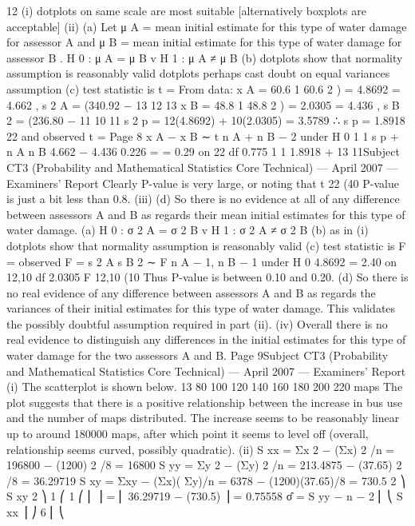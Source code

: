 12
(i)
dotplots on same scale are most suitable
[alternatively boxplots are acceptable]
(ii)
(a)
Let μ A = mean initial estimate for this type of water damage for
assessor A and μ B = mean initial estimate for this type of water damage
for assessor B .
H 0 : μ A = μ B v H 1 : μ A ≠ μ B
(b) dotplots show that normality assumption is reasonably valid
dotplots perhaps cast doubt on equal variances assumption
(c) test statistic is t =
From data: x A = 60.6
1
60.6 2
) = 4.8692
= 4.662 , s 2 A = (340.92 −
13
12
13
x B = 48.8
1
48.8 2
) = 2.0305
= 4.436 , s B 2 = (236.80 −
11
10
11
s 2 p = 12(4.8692) + 10(2.0305)
= 3.5789 ∴ s p = 1.8918
22
and
observed t =
Page 8
x A − x B
∼ t n A + n B − 2 under H 0
1
1
s p
+
n A n B
4.662 − 4.436
0.226
=
= 0.29 on 22 df
0.775
1 1
1.8918
+
13 11Subject CT3 (Probability and Mathematical Statistics Core Technical) — April 2007 — Examiners’ Report
Clearly P-value is very large, or noting that t 22 (40%
P-value is just a bit less than 0.8.
(iii)
(d) So there is no evidence at all of any difference between assessors A
and B as regards their mean initial estimates for this type of water
damage.
(a) H 0 : σ 2 A = σ 2 B v H 1 : σ 2 A ≠ σ 2 B
(b) as in (i) dotplots show that normality assumption is reasonably valid
(c) test statistic is F =
observed F =
s 2 A
s B 2
∼ F n A − 1, n B − 1 under H 0
4.8692
= 2.40 on 12,10 df
2.0305
F 12,10 (10%
Thus P-value is between 0.10 and 0.20.
(d)
So there is no real evidence of any difference between assessors A and
B as regards the variances of their initial estimates for this type of
water damage.
This validates the possibly doubtful assumption required in part (ii).
(iv)
Overall there is no real evidence to distinguish any differences in the initial
estimates for this type of water damage for the two assessors A and B.
Page 9Subject CT3 (Probability and Mathematical Statistics Core Technical) — April 2007 — Examiners’ Report
(i)
The scatterplot is shown below.
13
80
100
120
140
160
180
200
220
maps
The plot suggests that there is a positive relationship between the increase in
bus use and the number of maps distributed. The increase seems to be
reasonably linear up to around 180000 maps, after which point it seems to
level off (overall, relationship seems curved, possibly quadratic).
(ii)
S xx = Σx 2 − (Σx) 2 /n = 196800 − (1200) 2 /8 = 16800
S yy = Σy 2 − (Σy) 2 /n = 213.4875 − (37.65) 2 /8 = 36.29719
S xy = Σxy − (Σx)( Σy)/n = 6378 − (1200)(37.65)/8 = 730.5
2 ⎞
S xy 2 ⎞ 1 ⎛
1 ⎛ ⎜
⎟ = ⎜ 36.29719 − (730.5) ⎟ = 0.75558
σ̂ =
S yy −
n − 2 ⎜ ⎝
S xx ⎟ ⎠ 6 ⎜ ⎝
